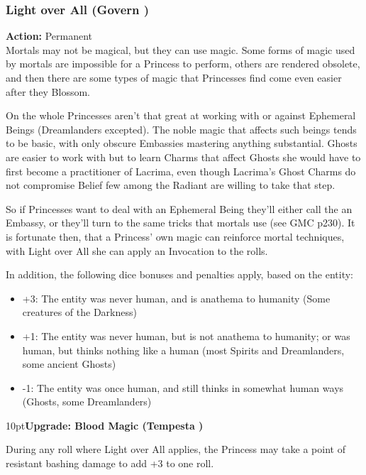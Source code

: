 \subsubsection*{Light over All (Govern \textbullet\textbullet)}

\noindent \textbf{Action:} Permanent \\

\noindent Mortals may not be magical, but they can use magic. Some forms of magic used by mortals are impossible for a Princess to perform, others are rendered obsolete, and then there are some types of magic that Princesses find come even easier after they Blossom. 

On the whole Princesses aren't that great at working with or against Ephemeral Beings (Dreamlanders excepted). The noble magic that affects such beings tends to be basic, with only obscure Embassies mastering anything substantial. Ghosts are easier to work with but to learn Charms that affect Ghosts she would have to first become a practitioner of Lacrima, even though Lacrima's Ghost Charms do not compromise Belief few among the Radiant are willing to take that step.

So if Princesses want to deal with an Ephemeral Being they'll either call the an Embassy, or they'll turn to the same tricks that mortals use (see GMC p230). It is fortunate then, that a Princess' own magic can reinforce mortal techniques, with Light over All she can apply an Invocation to the rolls. 

In addition, the following dice bonuses and penalties apply, based on the entity:

\begin{itemize} \item    +3: The entity was never human, and is anathema to humanity (Some creatures of the Darkness)
\item    +1: The entity was never human, but is not anathema to humanity; or was human, but thinks nothing like a human (most Spirits and Dreamlanders, some ancient Ghosts)
\item    -1: The entity was once human, and still thinks in somewhat human ways (Ghosts, some Dreamlanders)
\end{itemize}

\begin{myindentpar}{10pt}\textbf{Upgrade: Blood Magic (Tempesta \textbullet)}

During any roll where Light over All applies, the Princess may take a point of resistant bashing damage to add +3 to one roll.\end{myindentpar}


